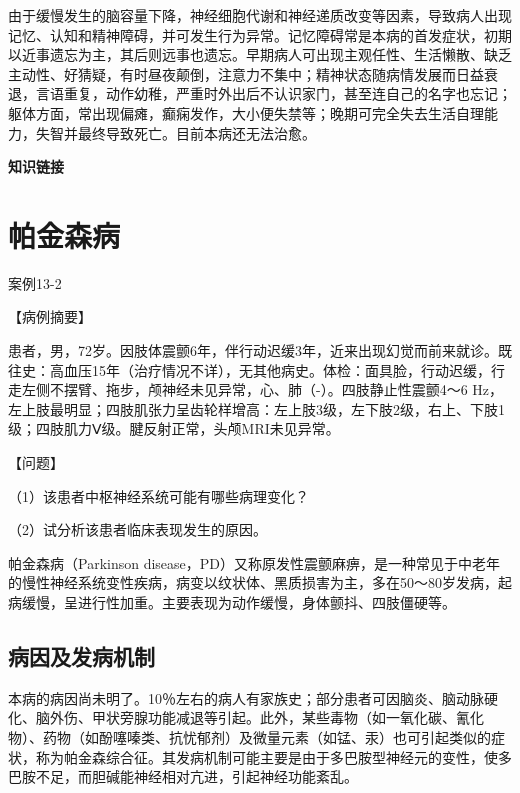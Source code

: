 由于缓慢发生的脑容量下降，神经细胞代谢和神经递质改变等因素，导致病人出现记忆、认知和精神障碍，并可发生行为异常。记忆障碍常是本病的首发症状，初期以近事遗忘为主，其后则远事也遗忘。早期病人可出现主观任性、生活懒散、缺乏主动性、好猜疑，有时昼夜颠倒，注意力不集中；精神状态随病情发展而日益衰退，言语重复，动作幼稚，严重时外出后不认识家门，甚至连自己的名字也忘记；躯体方面，常出现偏瘫，癫痫发作，大小便失禁等；晚期可完全失去生活自理能力，失智并最终导致死亡。目前本病还无法治愈。

\begin{center}
    \textbf{知识链接}
\end{center}

\section{帕金森病}
\begin{framed}
{案例13-2}

{【病例摘要】}

患者，男，72岁。因肢体震颤6年，伴行动迟缓3年，近来出现幻觉而前来就诊。既往史：高血压15年（治疗情况不详），无其他病史。体检：面具脸，行动迟缓，行走左侧不摆臂、拖步，颅神经未见异常，心、肺（-）。四肢静止性震颤4～6
Hz，左上肢最明显；四肢肌张力呈齿轮样增高：左上肢3级，左下肢2级，右上、下肢1级；四肢肌力Ⅴ级。腱反射正常，头颅MRI未见异常。

{【问题】}

（1）该患者中枢神经系统可能有哪些病理变化？

（2）试分析该患者临床表现发生的原因。
\end{framed}

帕金森病（Parkinson
disease，PD）又称原发性震颤麻痹，是一种常见于中老年的慢性神经系统变性疾病，病变以纹状体、黑质损害为主，多在50～80岁发病，起病缓慢，呈进行性加重。主要表现为动作缓慢，身体颤抖、四肢僵硬等。

\subsection{病因及发病机制}

本病的病因尚未明了。10％左右的病人有家族史；部分患者可因脑炎、脑动脉硬化、脑外伤、甲状旁腺功能减退等引起。此外，某些毒物（如一氧化碳、氰化物）、药物（如酚噻嗪类、抗忧郁剂）及微量元素（如锰、汞）也可引起类似的症状，称为帕金森综合征。其发病机制可能主要是由于多巴胺型神经元的变性，使多巴胺不足，而胆碱能神经相对亢进，引起神经功能紊乱。

